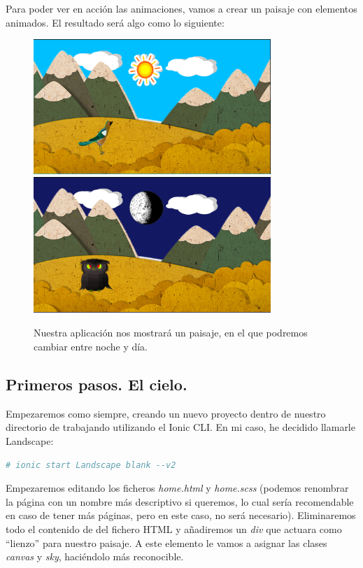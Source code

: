 Para poder ver en acción las animaciones, vamos a crear un paisaje con elementos animados. El resultado será algo como lo siguiente:

\begin{figure}[H]
\centering
    \centering
        \includegraphics[width=0.8\textwidth]{Figures/ch2/Landscape/final_day}
        \includegraphics[width=0.8\textwidth]{Figures/ch2/Landscape/final_nigth}
    \caption{Nuestra aplicación nos mostrará un paisaje, en el que podremos cambiar entre noche y día.}
\end{figure}

\subsection{Primeros pasos. El cielo.}


Empezaremos como siempre, creando un nuevo proyecto dentro de nuestro directorio de trabajando utilizando el Ionic CLI. En mi caso, he decidido llamarle Landscape:

\begin{lstlisting}[language=bash]
  # ionic start Landscape blank --v2
\end{lstlisting}

Empezaremos editando los ficheros \emph{home.html} y \emph{home.scss} (podemos renombrar la página con un nombre más descriptivo si queremos, lo cual sería recomendable en caso de tener más páginas, pero en este caso, no será necesario). Eliminaremos todo el contenido de del fichero HTML y añadiremos un \emph{div} que actuara como ``lienzo'' para nuestro paisaje. A este elemento le vamos a asignar las clases \emph{canvas} y \emph{sky}, haciéndolo más reconocible.

